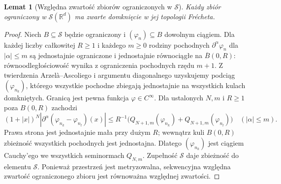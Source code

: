 \documentclass[11pt,a4paper]{article}
\numberwithin{equation}{section}
\theoremstyle{plain}
\newtheorem{lemat}[twierdzenie]{Lemat}
\theoremstyle{definition}
\theoremstyle{remark}
\newcommand{\R}{\mathbb R}
\begin{document}
\begin{lemat}[Względna zwartość zbiorów ograniczonych w $\mathcal S$]
\label{lem:montel-schwartz22}
Każdy zbiór ograniczony w $\mathcal S(\R^d)$ ma zwarte
domknięcie w jej topologii Frécheta.
\end{lemat}
\begin{proof}
Niech $B\subseteq\mathcal S$ będzie ograniczony i
$(\varphi_n)\subseteq B$ dowolnym ciągiem.
Dla każdej liczby całkowitej $R\ge1$ i każdego $m\ge0$
rodziny pochodnych $\partial^\alpha\varphi_n$ dla
$|\alpha|\le m$ są jednostajnie ograniczone i
jednostajnie równociągłe na $\overline B(0,R)$:
równoodległościowość wynika z ograniczenia pochodnych
rzędu $m+1$. Z twierdzenia Arzelà--Ascoliego
i argumentu diagonalnego uzyskujemy podciąg
$(\varphi_{n_k})$, którego wszystkie pochodne zbiegają
jednostajnie na wszystkich kulach domkniętych.
Granicą jest pewna funkcja $\varphi\in C^\infty$.
Dla ustalonych $N,m$ i $R\ge1$ poza $B(0,R)$ zachodzi
\[
(1+|x|)^N|\partial^\alpha(\varphi_{n_k}-\varphi_{n_l})(x)|
\le R^{-1}\bigl(Q_{N+1,m}(\varphi_{n_k})
+Q_{N+1,m}(\varphi_{n_l})\bigr)\quad(|\alpha|\le m).
\]
Prawa strona jest jednostajnie mała przy dużym $R$;
wewnątrz kuli $B(0,R)$ zbieżność wszystkich pochodnych
jest jednostajna. Dlatego $(\varphi_{n_k})$ jest ciągiem
Cauchy'ego we wszystkich seminormach $Q_{N,m}$.
Zupełność $\mathcal S$ daje zbieżność do elementu
$\mathcal S$. Ponieważ przestrzeń jest metryzowalna,
sekwencyjna względna zwartość ograniczonego zbioru
jest równoważna względnej zwartości.
\end{proof}
\end{document}
